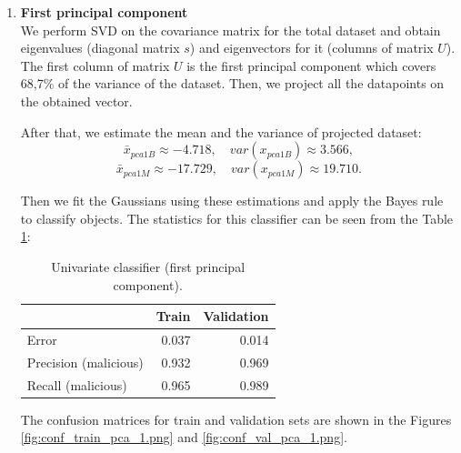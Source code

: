 \documentclass[11pt,a4paper]{article}
\begin{document}
\begin{enumerate}
\begin{enumerate}
	\item \textbf {First principal component} \\
	We perform SVD on the covariance matrix for the total dataset and obtain eigenvalues (diagonal matrix $s$) and eigenvectors for it (columns of matrix $U$). The first column of matrix $U$ is the first principal component which covers 68,7\% of the variance of the dataset. Then, we project all the datapoints on the obtained vector.
	
	After that, we estimate the mean and the variance of projected dataset:
	$$\bar{x}_{pca1B} \approx -4.718, \quad var(x_{pca1B}) \approx 3.566, $$
	$$\bar{x}_{pca1M} \approx -17.729, \quad var(x_{pca1M}) \approx 19.710.$$
	
	Then we fit the Gaussians using these estimations and apply the Bayes rule to classify objects.
	The statistics for this classifier can be seen from the Table \ref{tab:results-pca-1}:
	
	\begin{table}[H]
		\centering
		\begin{tabular}{lrr}
			\toprule
			& \textbf{Train} & \textbf{Validation}  \\ \midrule
			Error & 0.037 & 0.014 \\	
			Precision (malicious) & 0.932 & 0.969 \\
			Recall (malicious) & 0.965 & 0.989 \\
			\bottomrule
		\end{tabular}
		\caption{Univariate classifier (first principal component).}
		\label{tab:results-pca-1}
	\end{table}
	
	The confusion matrices for train and validation sets are shown in the Figures \ref{fig:conf_train_pca_1.png} and \ref{fig:conf_val_pca_1.png}.
	

\end{enumerate}
\end{enumerate}
\end{document}
